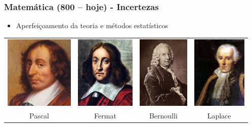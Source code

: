 \documentclass[aspectratio=169]{beamer}
\begin{document}
	\begin{frame}
		\frametitle{Matemática (800 – hoje) - Incertezas}
		\begin{itemize}
			\item Aperfeiçoamento da teoria e métodos estatísticos
			

		\end{itemize}

		
		\begin{adjustwidth}{-2.5em}{-2em}
			\begin{table}
				\centering
				\begin{tabular}{c c c c}				
					\includegraphics[height=3.5cm, keepaspectratio]{../figs/cap01/pascal.jpg} &				
					\includegraphics[height=3.5cm, keepaspectratio]{../figs/cap01/fermat.jpg} &				
					\includegraphics[height=3.5cm, keepaspectratio]{../figs/cap01/bernoulli.jpg} &				
					\includegraphics[height=3.5cm, keepaspectratio]{../figs/cap01/laplace.jpg} 
					\\
					Pascal & Fermat & Bernoulli & Laplace 		
					
				\end{tabular}
			\end{table}		
		\end{adjustwidth}		
		
	\end{frame}
\end{document}
